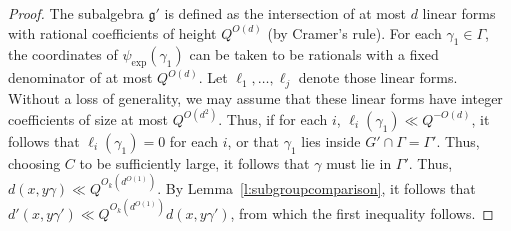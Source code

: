 \documentclass[11pt, a4paper]{amsart}
\theoremstyle{plain}
\theoremstyle{plain}
\theoremstyle{definition}
\theoremstyle{remark}
\numberwithin{equation}{section}
\numberwithin{lemma}{section}
\numberwithin{proposition}{section}
\numberwithin{corollary}{section}
\numberwithin{definition}{section}
\numberwithin{claim}{section}
\begin{document}
\begin{proof}
The subalgebra $\mathfrak{g}'$ is defined as the intersection of at most $d$ linear forms with rational coefficients of height $Q^{O(d)}$ (by Cramer's rule). For each $\gamma_1 \in \Gamma$, the coordinates of $\psi_{\exp}(\gamma_1)$ can be taken to be rationals with a fixed denominator of at most $Q^{O(d)}$. Let $\ell_1, \dots, \ell_j$ denote those linear forms. Without a loss of generality, we may assume that these linear forms have integer coefficients of size at most $Q^{O(d^2)}$. Thus, if for each $i$, $\ell_i(\gamma_1) \ll Q^{-O(d)}$, it follows that $\ell_i(\gamma_1) = 0$ for each $i$, or that $\gamma_1$ lies inside $G' \cap \Gamma = \Gamma'$. Thus, choosing $C$ to be sufficiently large, it follows that $\gamma$ must lie in $\Gamma'$. Thus, $d(x, y\gamma) \ll Q^{O_k(d^{O(1)})}$. By Lemma~\ref{l:subgroupcomparison}, it follows that $d'(x, y\gamma') \ll Q^{O_k(d^{O(1)})}d(x, y\gamma')$, from which the first inequality follows.
\end{proof}
\end{document}
